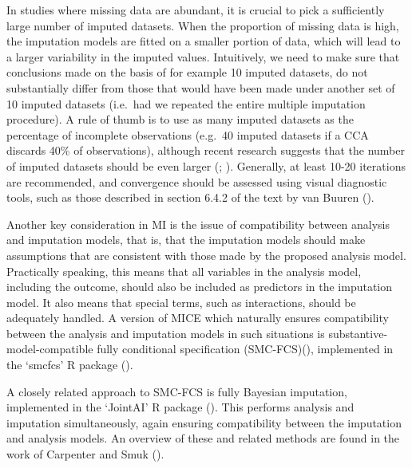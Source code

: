 \documentclass[
  letterpaper,
  paper=240mm:170mm,
  twoside=true,
  open=right,
  fontsize=10pt,
  pagesize=false,
  BCOR=15mm,
  DIV=14,
  headinclude=true,
  footinclude=false,
  headsepline=on]{scrbook}
\begin{document}
In studies where missing data are abundant, it is crucial to pick a
sufficiently large number of imputed datasets. When the proportion of
missing data is high, the imputation models are fitted on a smaller
portion of data, which will lead to a larger variability in the imputed
values. Intuitively, we need to make sure that conclusions made on the
basis of for example 10 imputed datasets, do not substantially differ
from those that would have been made under another set of 10 imputed
datasets (i.e.~had we repeated the entire multiple imputation
procedure). A rule of thumb is to use as many imputed datasets as the
percentage of incomplete observations (e.g.~40 imputed datasets if a CCA
discards 40\% of observations), although recent research suggests that
the number of imputed datasets should be even larger
(; ). Generally, at least 10-20 iterations are recommended,
and convergence should be assessed using visual diagnostic tools, such
as those described in section 6.4.2 of the text by van Buuren
().

Another key consideration in MI is the issue of compatibility between
analysis and imputation models, that is, that the imputation models
should make assumptions that are consistent with those made by the
proposed analysis model. Practically speaking, this means that all
variables in the analysis model, including the outcome, should also be
included as predictors in the imputation model. It also means that
special terms, such as interactions, should be adequately handled. A
version of MICE which naturally ensures compatibility between the
analysis and imputation models in such situations is
substantive-model-compatible fully conditional specification
(SMC-FCS)(), implemented in the `smcfcs' R package
().

A closely related approach to SMC-FCS is fully Bayesian imputation,
implemented in the `JointAI' R package
(). This performs analysis and imputation simultaneously, again
ensuring compatibility between the imputation and analysis models. An
overview of these and related methods are found in the work of Carpenter
and Smuk ().
\end{document}
